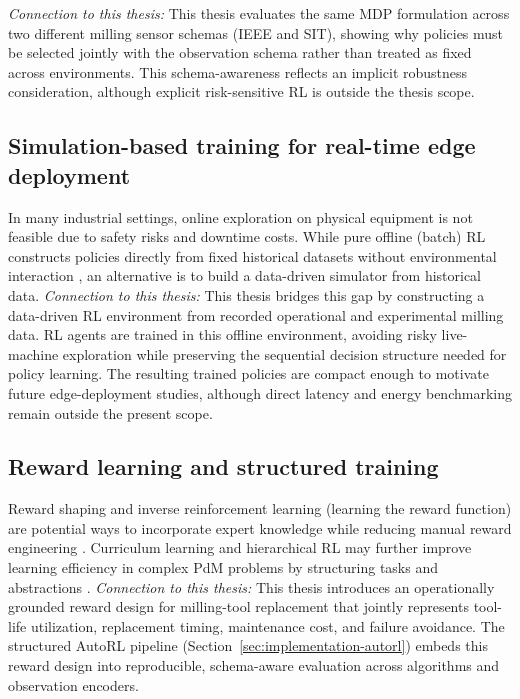 \documentclass[12pt,oneside]{book}
\begin{document}
\textit{Connection to this thesis:} This thesis evaluates the same MDP formulation across two different milling sensor schemas (IEEE and SIT), showing why policies must be selected jointly with the observation schema rather than treated as fixed across environments. This schema-awareness reflects an implicit robustness consideration, although explicit risk-sensitive RL is outside the thesis scope.

\subsection{Simulation-based training for real-time edge deployment}
In many industrial settings, online exploration on physical equipment is not feasible due to safety risks and downtime costs. While pure offline (batch) RL constructs policies directly from fixed historical datasets without environmental interaction \citep{lange2012batch}, an alternative is to build a data-driven simulator from historical data. \textit{Connection to this thesis:} This thesis bridges this gap by constructing a data-driven RL environment from recorded operational and experimental milling data. RL agents are trained in this offline environment, avoiding risky live-machine exploration while preserving the sequential decision structure needed for policy learning. The resulting trained policies are compact enough to motivate future edge-deployment studies, although direct latency and energy benchmarking remain outside the present scope.

\subsection{Reward learning and structured training}
Reward shaping and inverse reinforcement learning (learning the reward function) are potential ways to incorporate expert knowledge while reducing manual reward engineering \citep{Grzes2017}. Curriculum learning and hierarchical RL may further improve learning efficiency in complex PdM problems by structuring tasks and abstractions \citep{Narvekar2020Curriculum,hutsebaut2022hierarchical,sutton1999Options}. \textit{Connection to this thesis:} This thesis introduces an operationally grounded reward design for milling-tool replacement that jointly represents tool-life utilization, replacement timing, maintenance cost, and failure avoidance. The structured AutoRL pipeline (Section~\ref{sec:implementation-autorl}) embeds this reward design into reproducible, schema-aware evaluation across algorithms and observation encoders.
\end{document}
